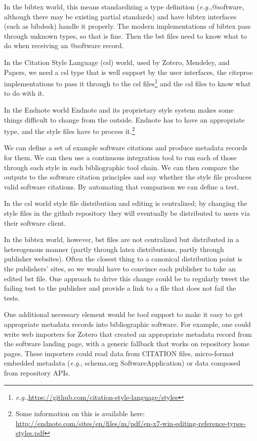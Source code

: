 \documentclass[a4paper,UKenglish]{dagman}
\newcommand{\eg}{\emph{e.g.},\xspace}
\begin{document}
In the bibtex world, this means standardizing a type definition (\eg @software, although there may be existing partial standards) and have bibtex interfaces (such as bibdesk) handle it properly. The modern implementations of bibtex pass through unknown types, so that is fine. Then the bst files need to know what to do when receiving an @software record.

In the Citation Style Language (csl) world, used by Zotero, Mendeley, and Papers, we need a csl type that is well support by the user interfaces, the citeproc implementations to pass it through to the csl files\footnote{\eg \url{https://github.com/citation-style-language/styles}} and the csl files to know what to do with it.

In the Endnote world Endnote and its proprietary style system makes some things difficult to change from the outside. Endnote has to have an appropriate type, and the style files have to process it.\footnote{Some information on this is available here:\\ \url{http://endnote.com/sites/en/files/m/pdf/en-x7-win-editing-reference-types-styles.pdf}}

We can define a set of example software citations and produce metadata records for them. We can then use a continuous integration tool to run each of those through each style in each bibliographic tool chain. We can then compare the outputs to the software citation principles and say whether the style file produces valid software citations. By automating that comparison we can define a test.

In the csl world style file distribution and editing is centralized; by changing the style files in the github repository they will eventually be distributed to users via their software client.

In the bibtex world, however, bst files are not centralized but distributed in a heterogenous manner (partly through latex distributions, partly through publisher websites). Often the closest thing to a canonical distribution point is the publishers' sites, so we would have to convince each publisher to take an edited bst file.  One approach to drive this change could be to regularly tweet the failing test to the publisher and provide a link to a file that does not fail the tests.

One additional necessary element would be tool support to make it easy to get appropriate metadata records into bibliographic software. For example, one could write web importers for Zotero that created an appropriate metadata record from the software landing page, with a generic fallback that works on repository home pages. These importers could read data from CITATION files, micro-format embedded metadata (\eg schema.org SoftwareApplication) or data composed from repository APIs.
\end{document}
